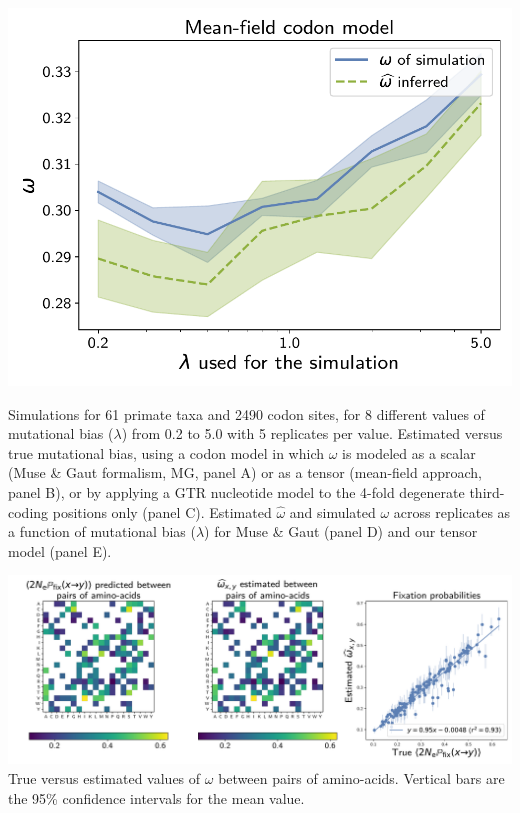 \documentclass{article}
\begin{document}
\begin{center}
    \begin{minipage}{0.325\linewidth}
        \includegraphics[width=\linewidth, page=1]{inference_supp_mat/PrimatesExons5Mu1.0_omega_MF.pdf}
    \end{minipage}
\end{center}
Simulations for 61 primate taxa and 2490 codon sites, for 8 different values of mutational bias ($\lambda$) from 0.2 to 5.0 with 5 replicates per value.
Estimated versus true mutational bias, using a codon model in which $\omega$ is modeled as a scalar (Muse \& Gaut formalism, MG, panel A) or as a tensor (mean-field approach, panel B), or by applying a GTR nucleotide model to the 4-fold degenerate third-coding positions only (panel C).
Estimated $\hat{\omega}$ and simulated $\omega$ across replicates as a function of mutational bias ($\lambda$) for Muse \& Gaut (panel D) and our tensor model (panel E).

\includegraphics[width=\linewidth, page=1]{inference_supp_mat/PrimatesExons5Mu1.0_omega_pair_MF.pdf}
True versus estimated values of $\omega$ between pairs of amino-acids.
Vertical bars are the 95\% confidence intervals for the mean value.
\end{document}
